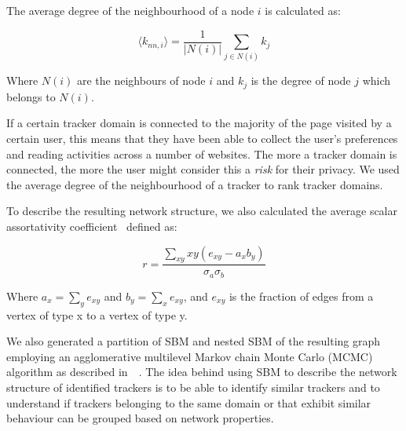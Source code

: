 The average degree of the neighbourhood of a node $i$ is calculated as:

$$ \langle k_{nn,i} \rangle= \frac{1}{| N(i) |} \sum_{j \in N(i) } {k_j} $$

Where $N(i)$ are the neighbours of node $i$ and $k_j$ is the degree of node $j$ which belongs to $N(i)$.

If a certain tracker domain is connected to the majority of the page visited by a certain user, this means that they have been able to collect the user's preferences and reading activities across a number of websites. The more a tracker domain is connected, the more the user might consider this a \emph{risk} for their privacy. We used the average degree of the neighbourhood of a tracker to rank tracker domains.

To describe the resulting network structure, we also calculated the average scalar assortativity coefficient~\cite{newman2002assortative} defined as:

$$ r = \frac{\sum_{xy} xy(e_{xy} - a_x b_y)}{\sigma_a\sigma_b} $$

Where $a_x=\sum_ye_{xy}$ and $b_y=\sum_xe_{xy}$, and $e_{xy}$ is the fraction of edges from a vertex of type x to a vertex of type y.

We also generated a partition of SBM and nested SBM of the resulting graph employing an agglomerative multilevel Markov chain Monte Carlo (MCMC) algorithm as described in~\cite{peixoto2014efficient}~\cite{peixoto2013parsimonious}\cite{peixoto2012entropy}. The idea behind using SBM to describe the network structure of identified trackers is to be able to identify similar trackers and to understand if trackers belonging to the same domain or that exhibit similar behaviour can be grouped based on network properties.

